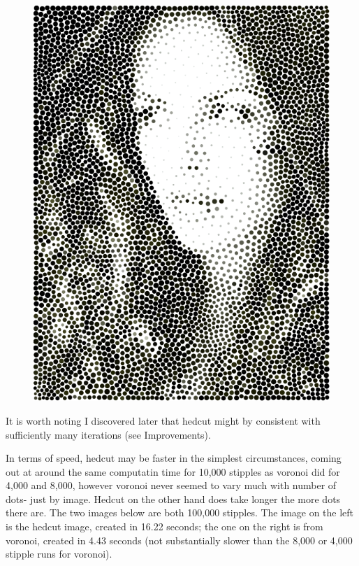 \documentclass[11pt]{article}
\begin{document}
\begin{figure}[H]
\includegraphics[scale=0.4]{fairyeyes-noverlap-4k-color-2.png}
\end{figure}

It is worth noting I discovered later that hedcut might by consistent with sufficiently many iterations (see Improvements).

In terms of speed, hedcut may be faster in the simplest circumstances, coming out at around the same computatin time for 10,000 stipples as voronoi did for 4,000 and 8,000, however voronoi never seemed to vary much with number of dots- just by image. Hedcut on the other hand does take longer the more dots there are. The two images below are both 100,000 stipples. The image on the left is the hedcut image, created in 16.22 seconds; the one on the right is from voronoi, created in 4.43 seconds (not substantially slower than the 8,000 or 4,000 stipple runs for voronoi).
\end{document}
